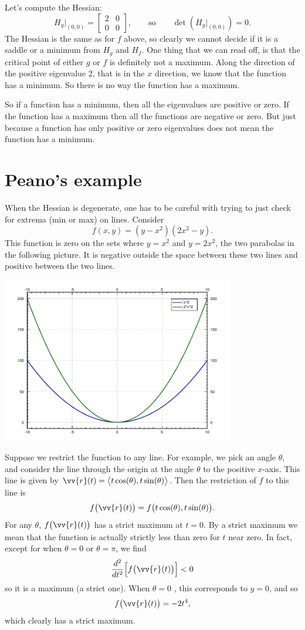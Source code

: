 \documentclass[12pt]{article}
\begin{document}
Let's compute the Hessian:
$$
H_g\big|_{(0,0)} =
\begin{bmatrix}
2 & 0 \\
0 & 0
\end{bmatrix}
,
\qquad \text{so} \qquad
\det(H_g\big|_{(0,0)}) = 0 .
$$
The Hessian is the same as for $f$ above, so clearly we cannot decide
if it is a saddle or a minimum
from $H_g$ and $H_f$.  One thing that we can read off, is that the critical
point of either $g$ or $f$ is definitely not a maximum.
Along the direction of the positive eigenvalue 2, that is in the $x$
direction, we know that the function
has a minimum.  So there is no way the function has a maximum.

So if a function has a minimum, then all the eigenvalues are positive or
zero.  If the function has a maximum then all the functions are negative or
zero.  But just because a function has only positive or zero eigenvalues
does not mean the function has a minimum.

\section{Peano's example}

When the Hessian is degenerate,
one has to be careful with trying to just check for extrema (min or max) on
lines.  Consider
$$
f(x,y) = (y-x^2)(2x^2-y) .
$$
This function is zero on the sets where $y=x^2$ and $y=2x^2$, the two
parabolas in the following picture.  It is negative outside the space
between these two lines and positive between the two lines.
\begin{center}
\includegraphics[width=4.0in]{peanocurves}
\end{center}
Suppose we restrict the function to any line. For example, we pick an angle
$\theta$, and consider the line through the origin at the angle 
$\theta$ to the positive $x$-axis.
This line is given by $\vv{r}(t) = \bigl\langle t \cos(\theta),t
\sin(\theta)\bigr\rangle$.  Then the restriction of $f$ to this line is
$$
f\bigl(\vv{r}(t)\bigr) = f\bigl(t\cos(\theta),t\sin (\theta)\bigr) .
$$
For any $\theta$, $f\bigl(\vv{r}(t)\bigr)$ has a strict maximum at $t=0$.
By a strict maximum we mean that the function is actually
strictly less than zero for $t$ near zero.
In fact, except for when $\theta=0$ or $\theta=\pi$, we find
$$
\frac{d^2}{dt^2} \Bigl[ f \bigl( \vv{r}(t) \bigr) \Bigr] < 0
$$
so it is a maximum (a strict one).  When $\theta = 0$ , this corresponds to
$y=0$, and so
$$
f \bigl( \vv{r}(t) \bigr) = -2t^4 ,
$$
which clearly has a strict maximum.
\end{document}
